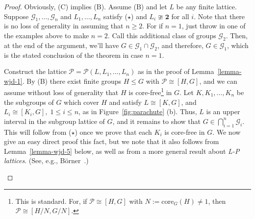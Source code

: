 \documentclass[cm,dissertation]{uhthesis}
\theoremstyle{plain}
\theoremstyle{definition}
\theoremstyle{remark}
\numberwithin{theorem}{section}
\numberwithin{claim}{chapter}
\numberwithin{equation}{section}
\numberwithin{conjecture}{chapter}
\newcommand{\<}{\ensuremath{\langle}}
\renewcommand{\>}{\ensuremath{\rangle}}
\renewcommand{\leq}{\ensuremath{\leqslant}}
\renewcommand{\geq}{\ensuremath{\geqslant}}
\newcommand{\core}{\ensuremath{\mathrm{core}}}
\newcommand{\0}{\ensuremath{\mathbf{0}}}
\newcommand{\1}{\ensuremath{\mathbf{1}}}
\newcommand{\2}{\ensuremath{\mathbf{2}}}
\newcommand{\3}{\ensuremath{\mathbf{3}}}
\newcommand{\4}{\ensuremath{\mathbf{4}}}
\newcommand{\5}{\ensuremath{\mathbf{5}}}
\newcommand{\sG}{\ensuremath{\mathscr{G}}}
\newcommand{\sP}{\ensuremath{\mathscr{P}}}
\newcommand{\two}{\ensuremath{\mathbf{2}}}
\begin{document}
\begin{proof}
Obviously, (C) implies (B).  Assume (B) and let $L$ be any finite lattice.  Suppose 
$\sG_1, \dots, \sG_n$ and $L_1, \dots, L_n$ satisfy ($\star$) and %
$L_i \ncong \two$ for all $i$.
Note that there is no loss of generality in assuming that $n\geq 2$. 
For if $n=1$, just throw in one of the examples above to make $n=2$.
Call this additional class of groups $\sG_2$.  Then, at the end of the argument, we'll
have $G\in \sG_1\cap \sG_2$, and therefore, $G\in \sG_1$, which is the stated
conclusion of the theorem in case $n=1$.

Construct the lattice $\sP = \sP(L, L_1, \dots, L_n)$ as in the proof of
Lemma~\ref{lemma-wjd-1}.  By (B) there exist finite groups $H \leq G$ with $\sP \cong
[H,G]$, and we can assume without loss of generality that $H$ is
core-free\footnote{This is standard.  For, if $\sP \cong [H,G]$ with
  $N:=\core_G(H)\neq 1$, then $\sP \cong [H/N, G/N]$.} in $G$.
Let $K, K_1, \dots, K_n$ be the subgroups of $G$ which cover $H$ and satisfy $L \cong
[K, G]$, and $L_i \cong [K_i, G], \; 1\leq i \leq n$, as in
Figure~\ref{fig:parachute} (b).
Thus, $L$ is an upper interval in the subgroup lattice of $G$, and it remains to show
that $G\in \bigcap\limits_{i=1}^n \sG_i$.  
This will follow from ($\star$) once we prove that 
each $K_i$ is core-free in $G$.
We now give an easy direct proof this fact,
but we note that it also follows from Lemma~\ref{lemma-wjd-5} below, as well as from a more
general result about \emph{L-P lattices}. (See, e.g., B\"orner~\cite{Borner:1999}.)

\begin{figure}[!h]
  \centering
\label{fig:isomorphism}  
\end{figure}
\end{proof}
\end{document}
